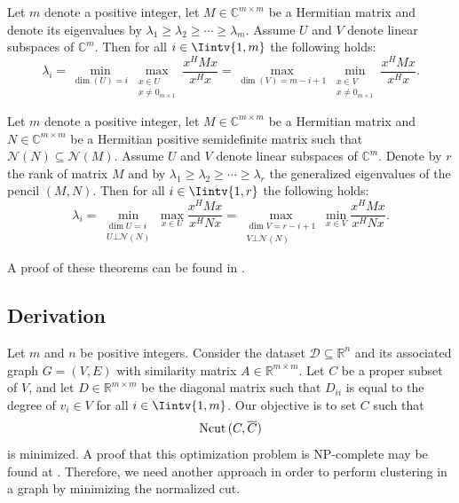 \begin{theorem} \label{minmax1}
   Let $m$ denote a positive integer, let $M \in \mathbb{C}^{m \times m}$ be a Hermitian matrix and denote its eigenvalues by $\lambda_1 \ge \lambda_2 \ge \cdots \ge \lambda_m$. 
   Assume $U$ and $V$ denote linear subspaces of $\mathbb C^{m }$.
   Then for all $i \in \Iintv{1,m}$ the following holds:
\begin{equation}
   \lambda_i = \min_{\dim (U) = i} \max_{\substack{x \in U \\ x \ne 0_{m \times 1}}} \frac{x^HMx}{x^Hx} = \max_{\dim (V) = m-i+1} \min_{\substack{x \in V \\ x \ne 0_{m \times 1}}} \frac{x^HMx}{x^Hx}.
\end{equation}
\end{theorem}

\begin{theorem} \label{minmax2}
   Let $m$ denote a positive integer, let $M \in \mathbb {C} ^{m \times m}$ be a Hermitian matrix and $N \in \mathbb C ^{m \times m}$ be a Hermitian positive semidefinite matrix such that $\mathcal N (N)  \subseteq \mathcal N (M)$.
   Assume $U$ and $V$ denote linear subspaces of $\mathbb C^{m }$.
   Denote by $r$ the rank of matrix $M$ and by $\lambda_1 \ge \lambda_2 \ge \cdots \ge \lambda_r$ the generalized eigenvalues of the pencil $(M,N)$.
   Then for all $i \in \Iintv{1,r}$ the following holds:
   \begin{equation}
      \lambda_i = \min_{\substack{ \dim U = i \\ U \bot \mathcal N (N)}} \max_{x \in U} \frac{x^HMx}{x^HNx} = \max_{\substack{\dim  V = r - i + 1 \\ V \bot \mathcal N (N)}} \min_{x \in V} \frac{x^HMx}{x^HNx}.
   \end{equation}
\end{theorem}
A proof of these theorems can be found in \cite{minmax}.

\subsection{Derivation}

Let $m$ and $n$ be positive integers. 
Consider the dataset $\mathcal D \subseteq \mathbb R ^{n }$ and its associated graph $G = (V,E)$ with similarity matrix $A \in \mathbb R^{m \times m}$.
Let $C$ be a proper subset of $V$, and let $D \in \mathbb R ^{m \times m}$ be the diagonal matrix such that $D_{ii}$ is equal to the degree of $v_i \in V$ for all $i \in \Iintv{1,m}$.
Our objective is to set $C$ such that 
\begin{equation}
   \operatorname*{Ncut\,} (C, \overline C)
\end{equation}
is minimized.
A proof that this optimization problem is NP-complete may be found at \cite{normalized}. 
Therefore, we need another approach in order to perform clustering in a graph by minimizing the normalized cut.

